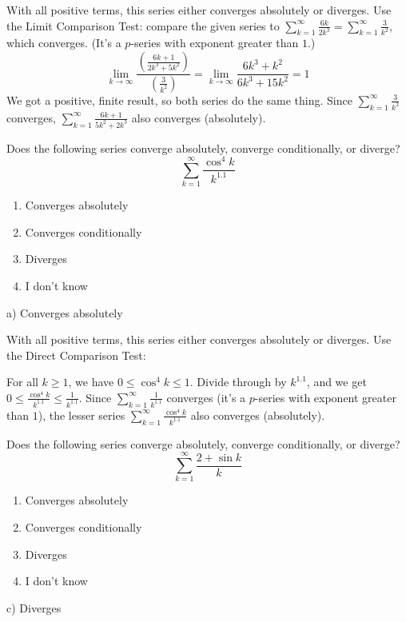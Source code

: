 \documentclass[addpoints,12pt,answers]{exam}
\begin{document}
\begin{questions}
\begin{solution}
    With all positive terms, this series either converges absolutely or diverges. Use the Limit Comparison Test: compare the given series to $\displaystyle\sum_{k=1}^\infty\frac{6k}{2k^3}=\sum_{k=1}^\infty\frac{3}{k^2}$, which converges. (It's a $p$-series with exponent greater than $1$.)
    $$\lim_{k\to\infty}\frac{\left(\frac{6k+1}{2k^3+5k^2}\right)}{\left(\frac{3}{k^2}\right)}=\lim_{k\to\infty}\frac{6k^3+k^2}{6k^3+15k^2}=1$$
    We got a positive, finite result, so both series do the same thing. Since $\displaystyle\sum_{k=1}^\infty\frac{3}{k^2}$ converges, $\displaystyle\sum_{k=1}^\infty\frac{6k+1}{5k^2+2k^3}$ also converges (absolutely).    
  \end{solution}
  \newpage
  \question
  Does the following series converge absolutely, converge conditionally, or diverge?
  $$\sum_{k=1}^\infty\frac{\cos^4 k}{k^{1.1}}$$
  \begin{enumerate}[label=\alph*)]
    \item
    Converges absolutely
    \item
    Converges conditionally
    \item
    Diverges
    \item
    I don't know
  \end{enumerate}
  \begin{solution}
    a) Converges absolutely
        
    With all positive terms, this series either converges absolutely or diverges. Use the Direct Comparison Test:
    
    For all $k\ge 1$, we have $0\le\cos^4 k\le 1$. Divide through by $k^{1.1}$, and we get $\displaystyle 0\le\frac{\cos^4 k}{k^{1.1}}\le\frac{1}{k^{1.1}}$. Since $\displaystyle\sum_{k=1}^\infty \frac{1}{k^{1.1}}$ converges (it's a $p$-series with exponent greater than $1$), the lesser series $\displaystyle\sum_{k=1}^\infty\frac{\cos^4 k}{k^{1.1}}$ also converges (absolutely).    
  \end{solution}
  \newpage
  \question
  Does the following series converge absolutely, converge conditionally, or diverge?
  $$\sum_{k=1}^\infty\frac{2+\sin k}{k}$$
  \begin{enumerate}[label=\alph*)]
    \item
    Converges absolutely
    \item
    Converges conditionally
    \item
    Diverges
    \item
    I don't know
  \end{enumerate}
  \begin{solution}
    c) Diverges
        

\end{solution}
\end{questions}
\end{document}
